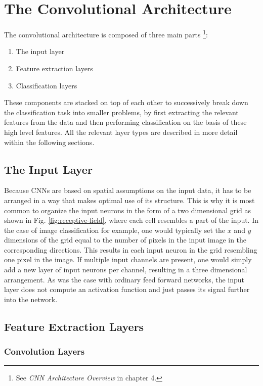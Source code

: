 \newpage
\section{The Convolutional Architecture}

The convolutional architecture is composed of three main parts
\cite{Patterson}\footnote{See \textit{CNN Architecture Overview} in
  chapter 4.}:
\begin{enumerate}
  \item The input layer
  \item Feature extraction layers
  \item Classification layers
\end{enumerate}
These components are stacked on top of each other to successively
break down the classification task into smaller problems, by first
extracting the relevant features from the data and then performing
classification on the basis of these high level features.
All the relevant layer types are described in
more detail within the following sections.

\subsection{The Input Layer}

Because CNNs are based on spatial assumptions on the input data, it
has to be arranged in a way that makes optimal use of its
structure. This is why it is most common to organize the input neurons
in the form of a two dimensional grid as shown in
Fig. \ref{fig:receptive-field}, where each cell resembles a
part of the input. In the case of image classification for example,
one would typically set the \(x\) and \(y\) dimensions of the grid
equal to the number of pixels in the input image in the corresponding
directions. This results in each input neuron in the grid resembling
one pixel in the image. If multiple input channels are present, one
would simply add a new layer of input neurons per channel, resulting
in a three dimensional arrangement. As was the case with ordinary feed
forward networks, the input layer does not compute an activation
function and just passes its signal further into the network.

\subsection{Feature Extraction Layers}

\subsubsection{Convolution Layers}

